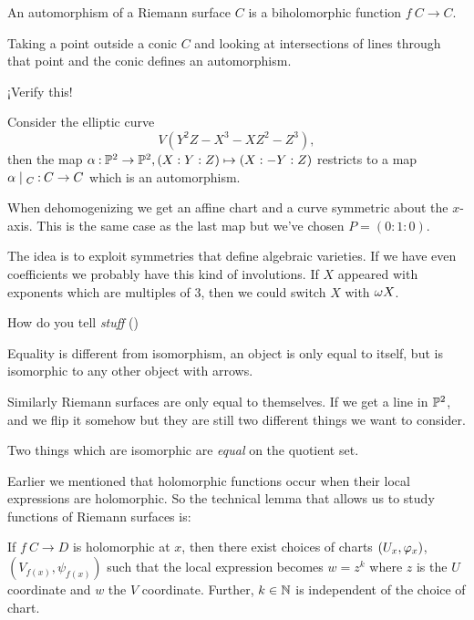 \documentclass[12pt]{memoir}
\begin{document}
\begin{Def}
    An automorphism of a Riemann surface $C$ is a biholomorphic function $f\: C\to C$.
\end{Def}

\begin{Ex}
    Taking a point outside a conic $C$ and looking at intersections of lines through that point and the conic defines an automorphism.
\end{Ex}

\begin{Ej}
    ¡Verify this!
\end{Ej}

\begin{Ex}
    Consider the elliptic curve
    $$V(Y^2Z-X^3-XZ^2-Z^3),$$
    then the map $\alpha\mathbin{:}\mathbb{P}^2\to\mathbb{P}^2,(X:Y:Z)\mapsto(X:-Y:Z)$ restricts to a map $\al\mid_C\: C\to C$ which is an automorphism.\par
    When dehomogenizing we get an affine chart and a curve symmetric about the $x$-axis. This is the same case as the last map but we've chosen $P=(0:1:0)$. 
\end{Ex}

The idea is to exploit symmetries that define algebraic varieties. If we have even coefficients we probably have this kind of involutions. If $X$ appeared with exponents which are multiples of 3, then we could switch $X$ with $\omega X$.

\begin{Qn}
    How do you tell \emph{stuff} ()
\end{Qn}

Equality is different from isomorphism, an object is only equal to itself, but is isomorphic to any other object with arrows.\par
Similarly Riemann surfaces are only equal to themselves. If we get a line in $\mathbb{P}^2$, and we flip it somehow but they are still two different things we want to consider.\par
Two things which are isomorphic are \emph{equal} on the quotient set.\par
Earlier we mentioned that holomorphic functions occur when their local expressions are holomorphic. So the technical lemma that allows us to study functions of Riemann surfaces is:

\begin{Lem}
    If $f\: C\to D$ is holomorphic at $x$, then there exist choices of charts $(U_x,\varphi_x)$, $(V_{f(x)},\psi_{f(x)})$ such that the local expression becomes $w=z^k$ where $z$ is the $U$ coordinate and $w$ the $V$ coordinate. Further, $k\in\mathbb{N}$ is independent of the choice of chart.
\end{Lem}
\end{document}
